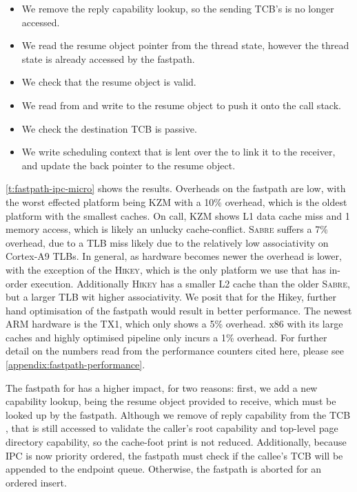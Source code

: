 \begin{itemize}
\item We remove the reply capability lookup, so the sending \gls{TCB}'s \cnode is no
        longer accessed. 
\item We read the resume object pointer from the thread state, however the thread state is already accessed
    by the \call fastpath. 
\item We check that the resume object is valid. 
\item We read from and write to the resume object to push it onto the call stack.
\item We check the destination \gls{TCB} is passive.
\item We write scheduling context that is lent over the \call to link it to the receiver, and update
    the back pointer to the resume object.
\end{itemize}

\cref{t:fastpath-ipc-micro} shows the results.
Overheads on the \call fastpath are low, with the worst effected platform being
\textsc{KZM} with a 10\% overhead, which is the oldest platform with the smallest caches. On call,
\textsc{KZM} shows L1 data cache miss and 1 memory access, which is likely an unlucky cache-conflict. \textsc{Sabre} suffers a 7\% overhead, due to a \gls{TLB} miss likely
due to the relatively low associativity on Cortex-A9 \glspl{TLB}.  In general, as hardware becomes newer the
overhead is lower, with the exception of the \textsc{Hikey}, which is the only platform we use that has 
in-order execution. Additionally \textsc{Hikey} has a smaller L2 cache than the older \textsc{Sabre},
but a larger \gls{TLB} wit higher associativity.
We posit that for the Hikey, further hand optimisation of the fastpath would result in better
performance. The newest ARM hardware is the TX1, which only shows a 5\% overhead. x86 with its large
caches and highly optimised pipeline only incurs a 1\% overhead. For further detail on the
numbers read from the performance counters cited here, please see
\cref{appendix:fastpath-performance}.

The fastpath for \replyrecv has a higher impact, for two reasons: first, we add a new capability
lookup, being the resume object provided to receive, which must be looked up by the \replyrecv
fastpath. Although we remove of reply capability from the \gls{TCB}
\cnode, that \cnode is still accessed to validate the caller's root \cnode capability
and top-level page directory capability, so the cache-foot print is not reduced. Additionally, because
\gls{IPC} is now priority ordered, the fastpath must check if the callee's \gls{TCB} will be appended to the
endpoint queue. Otherwise, the fastpath is aborted for an ordered insert. 

